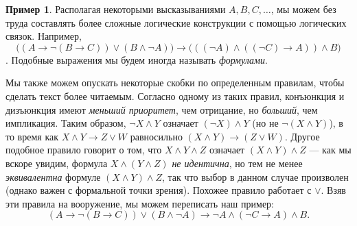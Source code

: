 \documentclass[12pt,notitlepage]{article}
\theoremstyle{plain}
\theoremstyle{definition}
\newtheorem{exm}[thm]{Пример}
\theoremstyle{plain}
\newcommand{\1}{\mathbf{1}}
\newcommand{\0}{\mathbf{0}}
\begin{document}
\begin{exm}
	Располагая некоторыми высказываниями $A, B, C,\dots$, мы можем без труда составлять более сложные логические конструкции с помощью логических связок. Например, 
	$$\bigl((A \to \neg(B \to C)) \vee (B \wedge \neg A)\bigr) \to \bigl(((\neg A) \wedge ((\neg C) \to A)) \wedge B \bigr)$$.
	Подобные выражения мы будем иногда называть \emph{формулами}.
	
	Мы также можем опускать некоторые скобки по определенным правилам, чтобы сделать текст более читаемым. Согласно одному из таких правил, конъюнкция и дизъюнкция имеют \emph{меньший приоритет}, чем отрицание, но \emph{больший}, чем импликация. Таким образом, $\neg X \wedge Y$ означает $(\neg X) \wedge Y$ (но не $\neg (X \wedge Y)$), в то время как $X \wedge Y \to Z \vee W$ равносильно $(X \wedge Y) \to (Z \vee W)$. Другое подобное правило говорит о том, что $X \wedge Y \wedge Z$ означает $(X \wedge Y) \wedge Z$ --- как мы вскоре увидим, формула $X \wedge (Y \wedge Z)$  \emph{не идентична}, но тем не менее \emph{эквивалентна} формуле $(X \wedge Y) \wedge Z$, так что выбор в данном случае произволен (однако важен с формальной точки зрения). Похожее правило работает с ${\vee}$. Взяв эти правила на вооружение, мы можем переписать наш пример:
	$$(A \to \neg(B \to C)) \vee (B \wedge \neg A) \to \neg A \wedge (\neg C \to A) \wedge B.$$
\end{exm}
\end{document}
